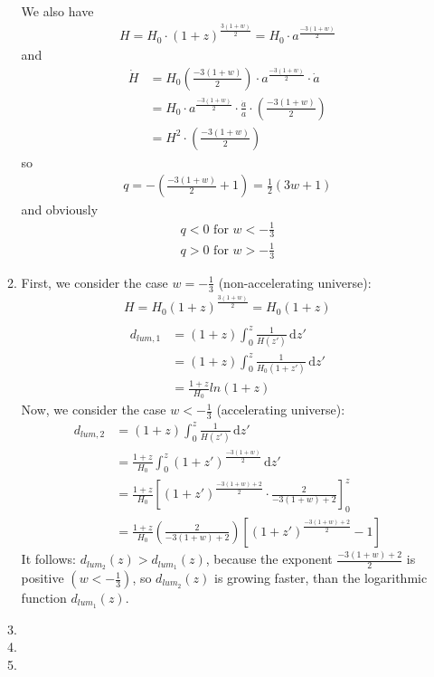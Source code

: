 \documentclass[a4paper,12pt]{article}
\begin{document}
\begin{enumerate}
\begin{enumerate}
		
		We also have
		\begin{align*}
		H=H_0\cdot(1+z)^{\frac{3(1+w)}{2}}=H_0\cdot a^{\frac{-3(1+w)}{2}}
		\end{align*}
		and
		\begin{align*}
		\dot{H}&=H_0\left(\frac{-3(1+w)}{2}\right)\cdot a^{\frac{-3(1+w)}{2}}\cdot \dot{a}\\
			  &=H_0\cdot a^{\frac{-3(1+w)}{2}}\cdot\frac{\dot{a}}{a}\cdot\left(\frac{-3(1+w)}{2}\right)\\
			  &=H^2\cdot \left(\frac{-3(1+w)}{2}\right)
		\end{align*}	
		so
		\begin{align*}
		q=-\left(\frac{-3(1+w)}{2}+1\right)=\frac{1}{2}(3w+1)
		\end{align*}
		and obviously
		\begin{align*}
		q<0 \text{ for } w<-\frac{1}{3}\\
		q>0 \text{ for } w>-\frac{1}{3}
		\end{align*}	
										
			\item
				First, we consider the case $w=-\frac{1}{3}$ (non-accelerating universe):
				\begin{align*}
			H=H_0(1+z)^{\frac{3(1+w)}{2}}=H_0(1+z)\\
\end{align*}	
\begin{align*}
d_{lum,1}&=(1+z)\int_0^z \! \frac{1}{H(z')} \, \mathrm{d}z'\\
			&=(1+z)\int_0^z \! \frac{1}{H_0(1+z')} \, \mathrm{d}z'\\
			&=\frac{1+z}{H_0}ln(1+z)
\end{align*}						
	Now, we consider the case $w<-\frac{1}{3}$ (accelerating universe):
	\begin{align*}
				d_{lum,2}&=(1+z)\int_0^z \! \frac{1}{H(z')} \, \mathrm{d}z'\\
				&=\frac{1+z}{H_0}\int_0^z \! (1+z')^{\frac{-3(1+w)}{2}} \, \mathrm{d}z'\\
				&=\frac{1+z}{H_0}\left[(1+z')^{\frac{-3(1+w)+2}{2}}\cdot \frac{2}{-3(1+w)+2}\right]_0^z\\
				&=\frac{1+z}{H_0}\left(\frac{2}{-3(1+w)+2}\right)\left[(1+z')^{\frac{-3(1+w)+2}{2}}-1\right]
\end{align*}	
It follows:
$d_{lum_2}(z)>d_{lum_1}(z)$, because the exponent $\frac{-3(1+w)+2}{2}$ is positive $(w<-\frac{1}{3})$,
so $d_{lum_2}(z)$ is growing faster, than the logarithmic function $d_{lum_1}(z)$.		
			\item
			\item
			\item
		\end{enumerate}
		
	\end{enumerate}
\end{document}

